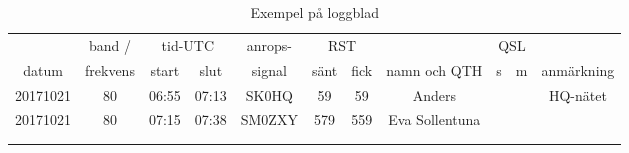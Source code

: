 \begin{table*}[h]
  \begin{center}
    \begin{tabular}{|c|c|c|c|c|c|c|c|c|c|c|}
      \hline
      & band / & \multicolumn{2}{|c|}{tid-UTC} & anrops- & \multicolumn{2}{|c|}{RST} & &
      \multicolumn{2}{|c|}{QSL} & \\
      datum & frekvens & start & slut & signal & sänt & fick & namn och QTH & s & m & anmärkning \\
      \hline
      \hline
      20171021 & 80 & 06:55 & 07:13 & SK0HQ & 59 & 59 & Anders & & & HQ-nätet \\
      \hline
      20171021 & 80 & 07:15 & 07:38 & SM0ZXY & 579 & 559 & Eva Sollentuna & & & \\
      \hline
      & & & & & & & & & & \\
      \hline
      & & & & & & & & & & \\
      \hline
    \end{tabular}
    \caption{Exempel på loggblad}
    \label{tab:loggblad}
  \end{center}
\end{table*}

